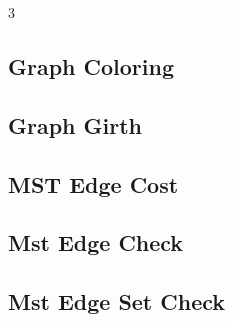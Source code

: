 \documentclass[8pt]{extarticle}
\begin{document}
\begin{multicols*}{3}
\subsection{Graph Coloring}
\begin{caixaenunciado}

\end{caixaenunciado}
\vspace{0.3cm}


\subsection{Graph Girth}
\begin{caixaenunciado}

\end{caixaenunciado}
\vspace{0.3cm}


\subsection{MST Edge Cost}
\begin{caixaenunciado}

\end{caixaenunciado}
\vspace{0.3cm}


\subsection{Mst Edge Check}
\begin{caixaenunciado}

\end{caixaenunciado}
\vspace{0.3cm}


\subsection{Mst Edge Set Check}
\begin{caixaenunciado}

\end{caixaenunciado}
\vspace{0.3cm}



\end{multicols*}
\end{document}
